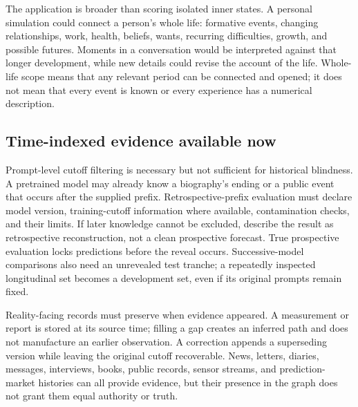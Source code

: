 \documentclass[10pt]{article}
\begin{document}
The application is broader than scoring isolated inner states. A personal
simulation could connect a person's whole life: formative events, changing
relationships, work, health, beliefs, wants, recurring difficulties, growth,
and possible futures. Moments in a conversation would be interpreted against
that longer development, while new details could revise the account of the
life. Whole-life scope means that any relevant period can be connected and
opened; it does not mean that every event is known or every experience has a
numerical description.

\subsection{Time-indexed evidence available now}

Prompt-level cutoff filtering is necessary but not sufficient for historical
blindness. A pretrained model may already know a biography's ending or a
public event that occurs after the supplied prefix. Retrospective-prefix
evaluation must declare model version, training-cutoff information where
available, contamination checks, and their limits. If later knowledge cannot
be excluded, describe the result as retrospective reconstruction, not a clean
prospective forecast. True prospective evaluation locks predictions before
the reveal occurs. Successive-model comparisons also need an unrevealed test
tranche; a repeatedly inspected longitudinal set becomes a development set,
even if its original prompts remain fixed.

Reality-facing records must preserve when evidence appeared. A measurement or
report is stored at its source time; filling a gap creates an inferred path and
does not manufacture an earlier observation. A correction appends a
superseding version while leaving the original cutoff recoverable. News,
letters, diaries, messages, interviews, books, public records, sensor streams,
and prediction-market histories can all provide evidence, but their presence in
the graph does not grant them equal authority or truth.
\end{document}
